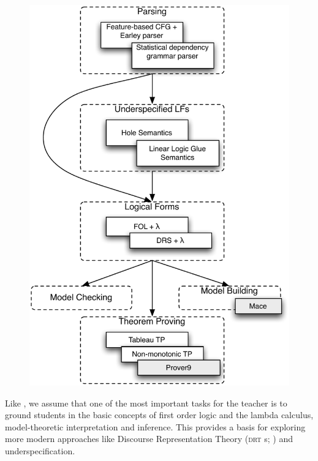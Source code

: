 \documentclass[11pt,a4paper]{article}
\newcommand{\DRT}{\textsc{drt}}
\begin{document}
\begin{figure}
  \centering
\includegraphics[scale=.6]{modules}  
\end{figure}

Like \citet{BB}, we assume that one of the most important tasks
for the teacher is to ground students in the basic concepts of first
order logic and the lambda calculus, model-theoretic interpretation
and inference. This provides a basis for exploring more modern approaches like
Discourse Representation Theory (\DRT
s; \citet{KampReyle}) and underspecification. 
\end{document}
